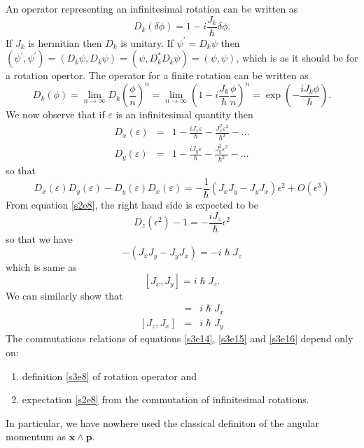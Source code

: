 \documentclass{article}
\numberwithin{equation}{section}
\let\vec\bm
\theoremstyle{plain}
\numberwithin{thm}{section}
\theoremstyle{plain}
\numberwithin{prop}{section}
\theoremstyle{definition}
\numberwithin{defn}{section}
\theoremstyle{remark}
\begin{document}
An operator representing an infinitesimal rotation can be written as
\begin{equation}\label{s3e7}
D_k(\delta\phi) = 1 - i\frac{J_k}{\hslash}\delta\phi.
\end{equation}
If $J_k$ is hermitian then $D_k$ is unitary. If $\psi^\prime = D_k\psi$ then
$(\psi^\prime, \psi^\prime) = (D_k\psi, D_k\psi) = (\psi, D_k^\ast D_k \psi)
= (\psi, \psi)$, which is as it should be for a rotation opertor. The operator
for a finite rotation can be written as
\begin{equation}\label{s3e8}
D_k(\phi) = \lim_{n \rightarrow \infty} D_k\left(\frac{\phi}{n}\right)^n =
\lim_{n \rightarrow \infty}\left(1-i\frac{J_k}{\hslash}\frac{\phi}{n}\right)^n
= \exp\left(-\frac{iJ_k\phi}{\hslash}\right).
\end{equation}
We now observe that if $\varepsilon$ is an infinitesimal quantity then
\begin{eqnarray}
D_x(\varepsilon) &=& 1 - \frac{iJ_x\varepsilon}{\hslash} - 
\frac{J_x^2 \varepsilon^2}{\hslash^2} - \ldots \label{s3e9} \\
D_y(\varepsilon) &=& 1 - \frac{iJ_y\varepsilon}{\hslash} - 
\frac{J_y^2 \varepsilon^2}{\hslash^2} - \ldots \label{s3e10} 
\end{eqnarray}
so that
\begin{equation}\label{s3e11}
D_x(\varepsilon)D_y(\varepsilon) - D_y(\varepsilon)D_x(\varepsilon) =
-\frac{1}{\hslash}(J_xJ_y-J_yJ_x)\epsilon^2+O(\epsilon^3)
\end{equation}
From equation \eqref{s2e8}, the right hand side is expected to be
\begin{equation}\label{s3e12}
D_z(\epsilon^2) - 1 = -\frac{iJ_z}{\hslash}\epsilon^2
\end{equation}
so that we have
\begin{equation}\label{s3e13}
-(J_xJ_y - J_yJ_x) = -i\hslash J_z
\end{equation}
which is same as
\begin{equation}\label{s3e14}
[J_x, J_y] = i\hslash J_z.
\end{equation}
We can similarly show that
\begin{eqnarray}
[J_y, J_z] &=& i\hslash J_x \label{s3e15} \\
{}[J_z, J_x] &=& i\hslash J_y \label{s3e16}
\end{eqnarray}
The commutations relations of equations \eqref{s3e14}, \eqref{s3e15}
and \eqref{s3e16} depend only on:
\begin{enumerate}
\item definition \eqref{s3e8} of rotation operator and
\item expectation \eqref{s2e8} from the commutation of infinitesimal
rotations.
\end{enumerate}
In particular, we have nowhere used the classical definiton of the
angular momentum as $\vec{x} \wedge \vec{p}$.
\end{document}
